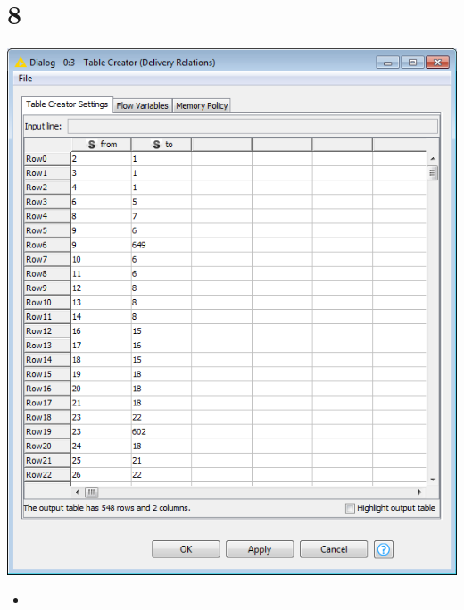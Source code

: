 \documentclass{beamer}
\begin{document}
\section{8}
\begin{frame}
	\begin{center}
  		\includegraphics[height=0.6\textheight]{8.png}
	\end{center}
	\begin{itemize}
		\item
	\end{itemize}
\end{frame}
\end{document}
